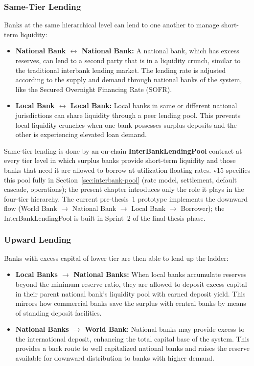 \documentclass[12pt,a4paper]{report}
\begin{document}
\subsubsection{Same-Tier Lending}

Banks at the same hierarchical level can lend to one another to manage short-term liquidity:

\begin{itemize}[noitemsep]
\item \textbf{National Bank $\leftrightarrow$ National Bank:} A national bank, which has excess reserves, can lend to a second party that is in a liquidity crunch, similar to the traditional interbank lending market. The lending rate is adjusted according to the supply and demand through national banks of the system, like the Secured Overnight Financing Rate (SOFR).
\item \textbf{Local Bank $\leftrightarrow$ Local Bank:} Local banks in same or different national jurisdictions can share liquidity through a peer lending pool. This prevents local liquidity crunches when one bank possesses surplus deposits and the other is experiencing elevated loan demand.
\end{itemize}

Same-tier lending is done by an on-chain \textbf{InterBankLendingPool} contract at every tier level in which surplus banks provide short-term liquidity and those banks that need it are allowed to borrow at utilization floating rates. v15 specifies this pool fully in Section~\ref{sec:interbank-pool} (rate model, settlement, default cascade, operations); the present chapter introduces only the role it plays in the four-tier hierarchy. The current pre-thesis~1 prototype implements the downward flow (World Bank $\to$ National Bank $\to$ Local Bank $\to$ Borrower); the InterBankLendingPool is built in Sprint~2 of the final-thesis phase.

\subsubsection{Upward Lending}

Banks with excess capital of lower tier are then able to lend up the ladder:

\begin{itemize}[noitemsep]
\item \textbf{Local Banks $\to$ National Banks:} When local banks accumulate reserves beyond the minimum reserve ratio, they are allowed to deposit excess capital in their parent national bank's liquidity pool with earned deposit yield. This mirrors how commercial banks save the surplus with central banks by means of standing deposit facilities.
\item \textbf{National Banks $\to$ World Bank:} National banks may provide excess to the international deposit, enhancing the total capital base of the system. This provides a back route to well capitalized national banks and raises the reserve available for downward distribution to banks with higher demand.
\end{itemize}
\end{document}
